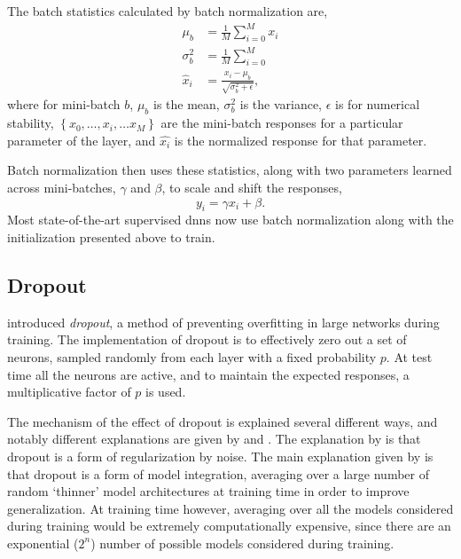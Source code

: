 \documentclass[thesis]{subfiles}
\begin{document}
The batch statistics calculated by batch normalization are,
\begin{equation}
\begin{aligned}
    \mu_b &= \frac{1}{M} \sum^M_{i=0} x_i\\
    \sigma^2_b &= \frac{1}{M} \sum^M_{i=0}\\
    \hat{x}_i &= \frac{x_i - \mu_b}{\sqrt{\sigma^2_b + \epsilon}},
\end{aligned}
\end{equation}
where for mini-batch $b$, $\mu_b$ is the mean, $\sigma^2_b$ is the variance, $\epsilon$ is for numerical stability, $\left\{x_0, \ldots, x_i, \ldots x_M\right\}$ are the mini-batch responses for a particular parameter of the layer, and $\hat{x_i}$ is the normalized response for that parameter. 

Batch normalization then uses these statistics, along with two parameters learned across mini-batches, $\gamma$ and $\beta$, to scale and shift the responses,
\begin{equation}    
    y_i = \gamma \hat{x_i} + \beta.
\end{equation}
%
Most state-of-the-art supervised \glspl{dnn} now use batch normalization along with the initialization presented above to train.

\subsection{Dropout}
\citet{dropout,dropoutjmlr} introduced \emph{dropout}, a method of preventing overfitting in large networks during training. The implementation of dropout is to effectively zero out a set of neurons, sampled randomly from each layer with a fixed probability $p$. At test time all the neurons are active, and to maintain the expected responses, a multiplicative factor of $p$ is used.

The mechanism of the effect of dropout is explained several different ways, and notably different explanations are given by \citet{dropout} and \citet{dropoutjmlr}. The explanation by \citet{dropout} is that dropout is a form of regularization by noise. The main explanation given by \citet{dropoutjmlr} is that dropout is a form of model integration, averaging over a large number of random `thinner' model architectures at training time in order to improve generalization. At training time however, averaging over all the models considered during training would be extremely computationally expensive, since there are an exponential ($2^n$) number of possible models considered during training.
\end{document}
